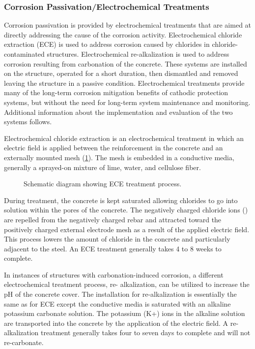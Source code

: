 \subsubsection{Corrosion Passivation/Electrochemical Treatments}
Corrosion passivation is provided by electrochemical treatments that are aimed at directly addressing the cause of
the corrosion activity. Electrochemical chloride extraction (ECE) is used to address corrosion caused by chlorides in
chloride-contaminated structures.
 Electrochemical re-alkalization is used to address corrosion resulting from
carbonation of the concrete. These systems are installed on the structure, operated for a short duration, then
dismantled and removed leaving the structure in a passive condition. Electrochemical treatments provide many of the
long-term corrosion mitigation benefits of cathodic protection systems, but without the need for long-term system
maintenance and monitoring. Additional information about the implementation and evaluation of the two systems
follows.

Electrochemical chloride extraction is an electrochemical treatment in which an electric field is applied between
the reinforcement in the concrete and an externally mounted mesh (\cref{fig:schematic-diagram-ece-treatment}). The mesh is embedded in a
conductive media, generally a sprayed-on mixture of lime, water, and cellulose fiber.

\begin{figure}
  \caption{Schematic diagram showing ECE treatment process.}
  \label{fig:schematic-diagram-ece-treatment}
\end{figure}

During treatment, the concrete is kept saturated allowing chlorides to go into solution within the pores of the
concrete. The negatively charged chloride ions () are repelled from the negatively charged rebar and attracted
toward the positively charged external electrode mesh as a result of the applied electric field. This process lowers the
amount of chloride in the concrete and particularly adjacent to the steel. An ECE treatment generally takes 4 to 8
weeks to complete.

In instances of structures with carbonation-induced corrosion, a different electrochemical treatment process, re-
alkalization, can be utilized to increase the pH of the concrete cover. The installation for re-alkalization is essentially
the same as for ECE except the conductive media is saturated with an alkaline potassium carbonate solution. The
potassium (K+) ions in the alkaline solution are transported into the concrete by the application of the electric field.
A re-alkalization treatment generally takes four to seven days to complete and will not re-carbonate.

